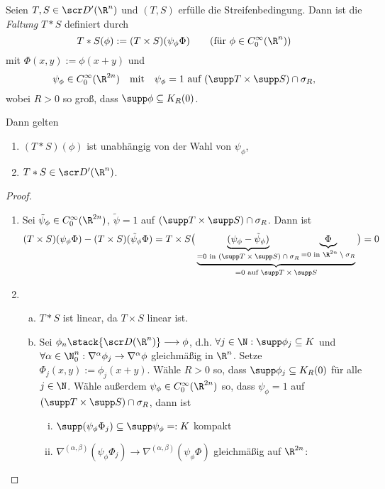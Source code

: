 \begin{st} \label{5.38}
	Seien $T,S \in \scr D'(\R^n)$ und $(T,S)$ erfülle die Streifenbedingung.
	Dann ist die \emph{Faltung} $T \ast S$ definiert durch
	\[
		T \ast S(\phi)
		:= (T \times S)(\psi_\phi \Phi)
		\qquad \text{(für $\phi \in C_0^\infty(\R^n)$)}
	\]
	mit $\Phi(x,y) := \phi(x+y)$ und
	\[
		\psi_\phi \in C_0^\infty(\R^{2n})
		\quad \text{mit} \quad
		\psi_\phi = 1 \text{ auf $(\supp T \times \supp S) \cap \sigma_R$,}
	\]
	wobei $R > 0$ so groß, dass $\supp \phi \subset K_R(0)$.

	Dann gelten
	\begin{enumerate}[1)]
		\item
			$(T \ast S)(\phi)$ ist unabhängig von der Wahl von $\psi_\phi$,
		\item
			$T \ast S \in \scr D'(\R^n)$.
	\end{enumerate}
	\begin{proof}
		\begin{enumerate}[1)]
			\item
				Sei $\tilde \psi_\phi \in C_0^\infty(\R^{2n})$, $\tilde \psi = 1$ auf $(\supp T \times \supp S) \cap \sigma_R$.
				Dann ist
				\begin{align*}
					(T\times S)(\psi_\phi \Phi) - (T\times S)(\tilde \psi_\phi \Phi)
					= T \times S \big( \underbrace{\underbrace{(\psi_\phi - \tilde \psi_\phi)}_{= 0 \text{ in $(\supp T \times \supp S) \cap \sigma_R$}} \underbrace{\Phi}_{= 0 \text{ in $\R^{2n} \setminus \sigma_R$}}}_{= 0 \text{ auf $\supp T \times \supp S$}} \big)
					= 0
				\end{align*}
			\item
				\begin{enumerate}[a)]
					\item
						$T \ast S$ ist linear, da $T \times S$ linear ist.
					\item
						Sei $\phi_n \stack{\scr D(\R^n)}\longrightarrow \phi$, d.h. $\forall j \in \N: \supp \phi_j \subset K$ und $\forall \alpha \in \N_0^n : \nabla^\alpha \phi_j \to \nabla^\alpha \phi$ gleichmäßig in $\R^n$.
						Setze $\Phi_j(x,y) := \phi_j(x+y)$.
						Wähle $R > 0$ so, dass $\supp \phi_j \subset K_R(0)$ für alle $j \in \N$.
						Wähle außerdem $\psi_\phi \in C_0^\infty(\R^{2n})$ so, dass $\psi_\phi = 1$ auf $(\supp T \times \supp S) \cap \sigma_R$, dann ist
						\begin{enumerate}[(i)]
							\item
								$\supp (\psi_\phi \Phi_j) \subset \supp \psi_\phi =: K$ kompakt
							\item
								$\nabla^{(\alpha,\beta)} (\psi_\phi \Phi_j) \to \nabla^{(\alpha, \beta)} (\psi_\phi \Phi)$ gleichmäßig auf $\R^{2n}$:


\end{enumerate}
\end{enumerate}
\end{enumerate}
\end{proof}
\end{st}
